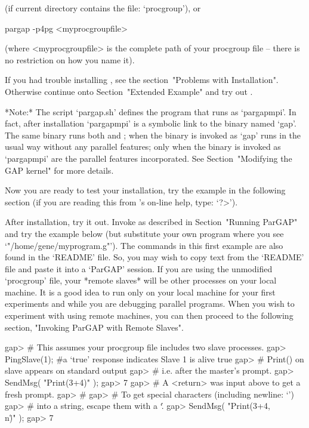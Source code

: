 (if current directory contains the file: `procgroup'), or

pargap -p4pg <myprocgroupfile>

(where <myprocgroupfile> is the complete path of your  procgroup  file --
there is no restriction on how you name it).

If you had trouble installing {\ParGAP}, see the  section~"Problems  with
Installation". Otherwise continue onto Section~"Extended Example" and try
out {\ParGAP}.

*Note:*
The script  `pargap.sh'  defines  the  program  that  runs  {\ParGAP}  as
`pargapmpi'. In fact, after installation `pargapmpi' is a  symbolic  link
to the {\GAP} binary named `gap'. The same binary runs  both  {\GAP}  and
{\ParGAP}; when the binary is invoked as `gap' {\GAP} runs in  the  usual
way without any parallel features; only when the  binary  is  invoked  as
`pargapmpi'    are    the    parallel    features    incorporated.    See
Section~"Modifying the GAP kernel" for more details.

Now you are ready to test your  installation,  try  the  example  in  the
following section (if you are reading this from  {\GAP}'s  on-line  help,
type: `?>').


After  installation,  try  it  out.  Invoke  {\ParGAP}  as  described  in
Section~"Running ParGAP" and try the example below (but  substitute  your
own program where you see `"/home/gene/myprogram.g"').  The  commands  in
this first example are also found in the `README' file. So, you may  wish
to copy text from the `README' file and paste it into a `ParGAP' session.
If you are using the unmodified `procgroup' file,  your  *remote  slaves*
will be other processes on your local machine. It is a good idea  to  run
only on your local machine for your first experiments and while  you  are
debugging parallel programs. When  you  wish  to  experiment  with  using
remote machines, you can then proceed to the following section, "Invoking
ParGAP with Remote Slaves".

\beginexample
gap> # This assumes your procgroup file includes two slave processes.
gap> PingSlave(1); #a `true' response indicates Slave 1 is alive
true
gap> # Print() on slave appears on standard output 
gap> # i.e. after the master's prompt.
gap> SendMsg( "Print(3+4)" );
gap> 7
gap> # A <return> was input above to get a fresh prompt.
gap> #
gap> # To get special characters (including newline: `\n')
gap> # into a string, escape them with a `\'.
gap> SendMsg( "Print(3+4,\"\\n\")" );
gap> 7

